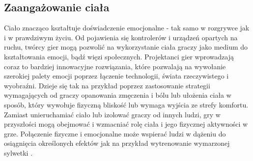 \subsection{Zaangażowanie ciała}

Ciało znacząco kształtuje doświadczenie emocjonalne - tak samo w rozgrywce jak i w prawdziwym życiu. Od pojawienia się kontrolerów i urządzeń opartych na ruchu, twórcy gier mogą pozwolić na wykorzystanie ciała graczy jako medium do kształtowania emocji, bądź więzi społecznych. Projektanci gier wprowadzają coraz to bardziej innowacyjne rozwiązania, które pozwalają na wywołanie szerokiej palety emocji poprzez łączenie technologii, świata rzeczywistego i wyobraźni. Dzieje się tak na przykład poprzez zastosowanie strategii wymagających od graczy opanowania zmęczenia i bólu lub ułożenia ciała w sposób, który wywołuje fizyczną bliskość lub wymaga wyjścia ze strefy komfortu. Zamiast unieruchamiać ciało lub izolować graczy od innych ludzi, gry w przyszłości mogą obejmować i wzmacniać rolę ciała i jego fizycznej aktywności w grze. Połączenie fizyczne i emocjonalne może wspierać ludzi w dążeniu do osiągnięcia określonych efektów jak na przykład wytrenowanie wymarzonej sylwetki \citep{movesus}.